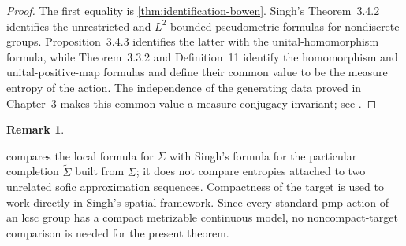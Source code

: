 \documentclass[12pt]{amsart}
\theoremstyle{definition}
\newtheorem{remark}[remark]{Remark}
\newcommand{\1}{\mathbf 1}
\begin{document}
\begin{proof}
	The first equality is \cref{thm:identification-bowen}. Singh's
	Theorem~3.4.2 identifies the unrestricted and $L^2$-bounded pseudometric
	formulas for nondiscrete groups. Proposition~3.4.3 identifies the latter
	with the unital-homomorphism formula, while Theorem~3.3.2 and
	Definition~11 identify the homomorphism and unital-positive-map formulas and
	define their common value to be the measure entropy of the action. The
	independence of the generating data proved in Chapter~3 makes this common
	value a measure-conjugacy invariant; see
	\cite[Theorems~3.2.3, 3.3.2, 3.4.2, Proposition~3.4.3, and
	Definition~11]{SinghThesis}.
\end{proof}


\begin{remark}\label{rem:scope-comparison}

	 compares the local formula for
	$\Sigma$ with Singh's formula for the particular completion
	$\widetilde\Sigma$ built from $\Sigma$; it does not compare entropies
	attached to two unrelated sofic approximation sequences.  Compactness of the
	target is used to work directly in Singh's spatial framework.  Since every
	standard pmp action of an lcsc group has a compact metrizable continuous
	model, no noncompact-target comparison is needed for the present theorem.

\end{remark}
\end{document}
